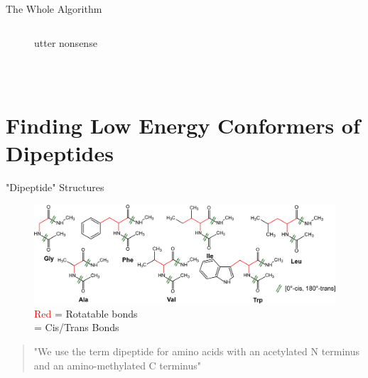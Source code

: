 \documentclass[10pt]{beamer}
\begin{document}
{\begin{frame}{The Whole Algorithm}
\begin{columns}[c]
\begin{column}{0.6\textwidth}
\begin{itemize}
{{\begin{figure}
					    \caption*{utter nonsense}
					\end{figure}
				}}
			\end{itemize}
		\end{column}
	\end{columns}
	~
\end{frame}

\section{Finding Low Energy Conformers of Dipeptides}

{%
\begin{frame}{"Dipeptide" Structures}
   	\begin{figure}
   		\includegraphics[width=\linewidth]{images/Supady2.png}
   		\caption*{\textcolor{red}{Red} = Rotatable bonds \\
		   		  \textbf{\textcolor{darkgreen}{\ce{<=>}}} = Cis/Trans Bonds
		   		  }
   	\end{figure}
   	\begin{quote}
       	"We use the term dipeptide for amino acids with an acetylated 
       	N terminus and an amino-methylated C terminus"
    \end{quote}
\end{frame}
}

}
\end{document}
